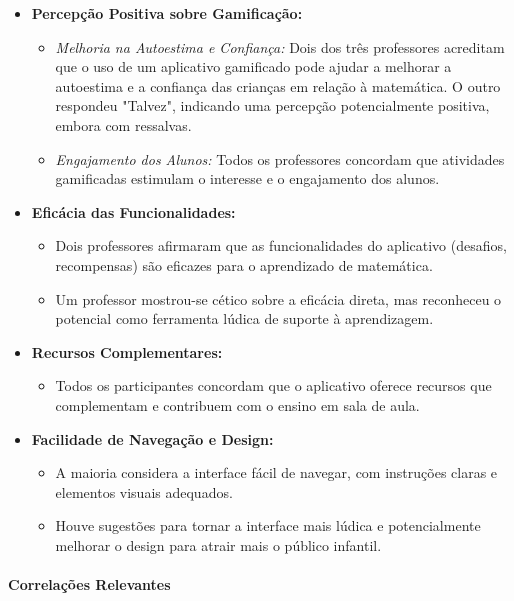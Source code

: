 \begin{itemize}
    \item \textbf{Percepção Positiva sobre Gamificação:}
    \begin{itemize}
        \item \textit{Melhoria na Autoestima e Confiança:} Dois dos três professores acreditam que o uso de um aplicativo gamificado pode ajudar a melhorar a autoestima e a confiança das crianças em relação à matemática. O outro respondeu "Talvez", indicando uma percepção potencialmente positiva, embora com ressalvas.
        \item \textit{Engajamento dos Alunos:} Todos os professores concordam que atividades gamificadas estimulam o interesse e o engajamento dos alunos.
    \end{itemize}
    \item \textbf{Eficácia das Funcionalidades:}
    \begin{itemize}
        \item Dois professores afirmaram que as funcionalidades do aplicativo (desafios, recompensas) são eficazes para o aprendizado de matemática.
        \item Um professor mostrou-se cético sobre a eficácia direta, mas reconheceu o potencial como ferramenta lúdica de suporte à aprendizagem.
    \end{itemize}
    \item \textbf{Recursos Complementares:}
    \begin{itemize}
        \item Todos os participantes concordam que o aplicativo oferece recursos que complementam e contribuem com o ensino em sala de aula.
    \end{itemize}
    \item \textbf{Facilidade de Navegação e Design:}
    \begin{itemize}
        \item A maioria considera a interface fácil de navegar, com instruções claras e elementos visuais adequados.
        \item Houve sugestões para tornar a interface mais lúdica e potencialmente melhorar o design para atrair mais o público infantil.
    \end{itemize}
\end{itemize}

\paragraph{Correlações Relevantes}

